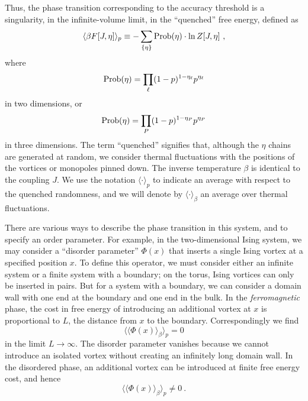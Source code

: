 Thus, the phase transition corresponding to the accuracy threshold is a singularity, in the infinite-volume limit, in the ``quenched'' free energy, defined as
\begin{equation}
\langle \beta F[J,\eta] \rangle_p\equiv -\sum_{\{\eta\}}{\rm Prob}(\eta)\cdot \ln Z[J,\eta]~,
\end{equation}
where
\begin{equation}
{\rm Prob}(\eta)= \prod_\ell (1-p)^{1-\eta_\ell}p^{\eta_\ell}
\end{equation}
in two dimensions, or 
\begin{equation}
{\rm Prob}(\eta)= \prod_P (1-p)^{1-\eta_P}p^{\eta_P}
\label{eta_prob}
\end{equation}
in three dimensions. The term ``quenched'' signifies that, although the $\eta$ chains are generated at random, we consider thermal fluctuations with the positions of the vortices or monopoles pinned down. The inverse temperature $\beta$ is identical to the coupling $J$. We use the notation $\langle\cdot\rangle_p$ to indicate an average with respect to the quenched randomness, and we will denote by $\langle \cdot\rangle_\beta$ an average over thermal fluctuations.

There are various ways to describe the phase transition
in this system, and to specify an order parameter. For example, in the two-dimensional Ising system, we may consider a ``disorder parameter'' $\Phi(x)$ that inserts
a single Ising vortex at a specified position $x$.  To define this
operator, we must consider either an infinite system or a finite system
with a boundary; on the torus, Ising vortices can only be inserted in
pairs.  But for a system with a boundary, we can consider a domain wall
with one end at the boundary and one end in the bulk.  In the {\em ferromagnetic} phase, the cost in free energy of introducing an
additional vortex at $x$ is proportional to $L$, the distance from $x$ to the
boundary.  Correspondingly we find
\begin{equation}
\langle\langle \Phi (x)\rangle_\beta \rangle_p= 0
\end{equation}
in the limit $L \rightarrow \infty$.  The disorder parameter vanishes because we cannot
introduce an isolated vortex without creating an infinitely long domain
wall.  In the disordered phase, an additional vortex can be introduced
at finite free energy cost, and hence
\begin{equation}
\langle\langle \Phi (x)\rangle_\beta\rangle_p \not= 0~.
\end{equation}

